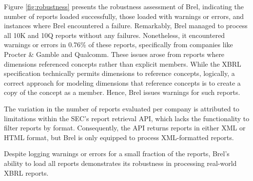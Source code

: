 Figure \ref{fig:robustness} presents the robustness assessment of Brel, 
indicating the number of reports loaded successfully, those loaded with warnings or errors, 
and instances where Brel encountered a failure. 
Remarkably, Brel managed to process all 10K and 10Q reports without any failures. 
Nonetheless, it encountered warnings or errors in 0.76\% of these reports, 
specifically from companies like Procter \& Gamble and Qualcomm. 
These issues arose from reports where dimensions referenced concepts rather than explicit members. 
While the XBRL specification technically permits dimensions to reference concepts, logically, 
a correct approach for modeling dimensions that reference concepts is to create a copy of the concept as a member. 
Hence, Brel issues warnings for such reports.

The variation in the number of reports evaluated per company is attributed to limitations within the SEC's report retrieval API, 
which lacks the functionality to filter reports by format. 
Consequently, the API returns reports in either XML or HTML format, but Brel is only equipped to process XML-formatted reports.

Despite logging warnings or errors for a small fraction of the reports, 
Brel's ability to load all reports demonstrates its robustness in processing real-world XBRL reports.
